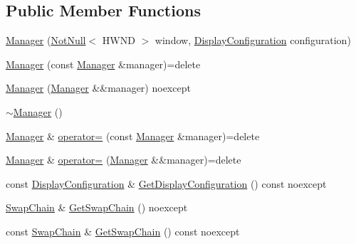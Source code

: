 \subsection*{Public Member Functions}
\begin{DoxyCompactItemize}
\item 
\mbox{\hyperlink{classmage_1_1rendering_1_1_manager_acf71efbc73317b319be41682505695f1}{Manager}} (\mbox{\hyperlink{namespacemage_a8769f9d670d6b585ea306cb1062af94b}{Not\+Null}}$<$ H\+W\+ND $>$ window, \mbox{\hyperlink{classmage_1_1rendering_1_1_display_configuration}{Display\+Configuration}} configuration)
\item 
\mbox{\hyperlink{classmage_1_1rendering_1_1_manager_a85b0881e007cf5ad3646de67c21a0312}{Manager}} (const \mbox{\hyperlink{classmage_1_1rendering_1_1_manager}{Manager}} \&manager)=delete
\item 
\mbox{\hyperlink{classmage_1_1rendering_1_1_manager_a23fc23a973ca28176f950c750be2d27a}{Manager}} (\mbox{\hyperlink{classmage_1_1rendering_1_1_manager}{Manager}} \&\&manager) noexcept
\item 
\mbox{\hyperlink{classmage_1_1rendering_1_1_manager_a9b43ab8313e441faadb60863759bbc46}{$\sim$\+Manager}} ()
\item 
\mbox{\hyperlink{classmage_1_1rendering_1_1_manager}{Manager}} \& \mbox{\hyperlink{classmage_1_1rendering_1_1_manager_acbc8c70a805b9f82268dd0391aa96e44}{operator=}} (const \mbox{\hyperlink{classmage_1_1rendering_1_1_manager}{Manager}} \&manager)=delete
\item 
\mbox{\hyperlink{classmage_1_1rendering_1_1_manager}{Manager}} \& \mbox{\hyperlink{classmage_1_1rendering_1_1_manager_abd824b25445bd67bfbddb49961796f28}{operator=}} (\mbox{\hyperlink{classmage_1_1rendering_1_1_manager}{Manager}} \&\&manager)=delete
\item 
const \mbox{\hyperlink{classmage_1_1rendering_1_1_display_configuration}{Display\+Configuration}} \& \mbox{\hyperlink{classmage_1_1rendering_1_1_manager_ac316fed528d23c8234dc3457beb3ed33}{Get\+Display\+Configuration}} () const noexcept
\item 
\mbox{\hyperlink{classmage_1_1rendering_1_1_swap_chain}{Swap\+Chain}} \& \mbox{\hyperlink{classmage_1_1rendering_1_1_manager_a3cfc594583bb0c762375a1283d263fd1}{Get\+Swap\+Chain}} () noexcept
\item 
const \mbox{\hyperlink{classmage_1_1rendering_1_1_swap_chain}{Swap\+Chain}} \& \mbox{\hyperlink{classmage_1_1rendering_1_1_manager_a219939c5316dd348822e39c89141d429}{Get\+Swap\+Chain}} () const noexcept

\end{DoxyCompactItemize}

